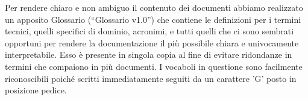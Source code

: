 Per rendere chiaro e non ambiguo il contenuto dei documenti  abbiamo realizzato un apposito Glossario (“Glossario v1.0”) che contiene le definizioni per i termini tecnici, quelli specifici di dominio, acronimi, e tutti quelli che ci sono sembrati opportuni per rendere la documentazione il più possibile chiara e univocamente interpretabile. Esso è presente in singola copia al fine di evitare ridondanze in termini che compaiono in più documenti.
I vocaboli in questione sono facilmente riconoscibili poiché scritti immediatamente seguiti da un carattere 'G' posto in posizione pedice.
